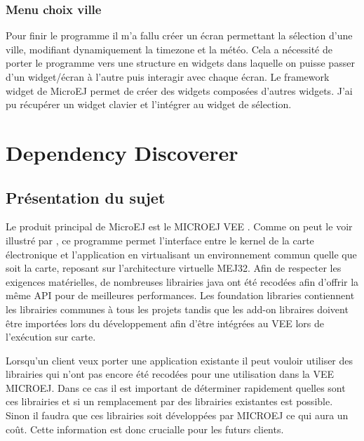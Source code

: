 \documentclass[french,a4paper,12pt]{report}
\begin{document}
\subsection{Menu choix ville}

Pour finir le programme il m’a fallu créer un écran permettant la sélection d’une ville, modifiant dynamiquement la timezone et la météo. Cela a nécessité de porter le programme vers une structure en widgets dans laquelle on puisse passer d’un widget/écran à l’autre puis interagir avec chaque écran.
Le framework widget de MicroEJ permet de créer des widgets composées d’autres widgets. J'ai pu récupérer un widget clavier et l’intégrer au widget de sélection. 

\chapter{Dependency Discoverer}

\section{Présentation du sujet}

Le produit principal de MicroEJ est le MICROEJ VEE . Comme on peut le voir illustré par , ce programme permet l’interface entre le kernel de la carte électronique et l’application en virtualisant un environnement commun quelle que soit la carte, reposant sur l’architecture virtuelle MEJ32. Afin de respecter les exigences matérielles, de nombreuses librairies java ont été recodées afin d’offrir la même API pour de meilleures performances. Les foundation libraries contiennent les librairies communes à tous les projets tandis que les add-on libraires doivent être importées lors du développement afin d’être intégrées au VEE lors de l’exécution sur carte.

Lorsqu’un client veux porter une application existante il peut vouloir utiliser des librairies qui n’ont pas encore été recodées pour une utilisation dans la VEE MICROEJ. Dans ce cas il est important de déterminer rapidement quelles sont ces librairies et si un remplacement par des librairies existantes est possible. Sinon il faudra que ces librairies soit développées par MICROEJ ce qui aura un coût. Cette information est donc crucialle pour les futurs clients.
 
\end{document}
